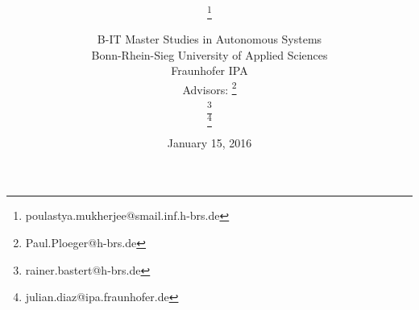 \title{\PaperTitle\\\PaperSubject}
\author{\href{\PaperMainWriterEMail}{\PaperMainWriter \footnote{\href{\PaperMainWriterEMail} {poulastya.mukherjee@smail.inf.h-brs.de}} 
}\\%
\vspace{0.5cm} \\ 
B-IT Master Studies in Autonomous Systems \vspace{0.5cm} \\ 
Bonn-Rhein-Sieg University of Applied Sciences  \vspace{1.6cm}\\
Fraunhofer IPA \vspace{0.7cm} \\ \setcounter{footnote}{6}
Advisors: \href{\PaperLecturerEMail}{\PaperLecturer \footnote{\href{\PaperLecturerEMail} {Paul.Ploeger@h-brs.de}}}\\ %
\hspace{0.35cm}\href{\SecondAdvisorEMail}{\SecondAdvisor \footnote{\href{\SecondAdvisorEMail} {rainer.bastert@h-brs.de}}}\\
\hspace{0.35cm}\href{\ThirdAdvisorEMail}{\ThirdAdvisor \footnote{\href{\ThirdAdvisorEMail} {julian.diaz@ipa.fraunhofer.de}}}
}%
\date{January 15, 2016}
\maketitle
